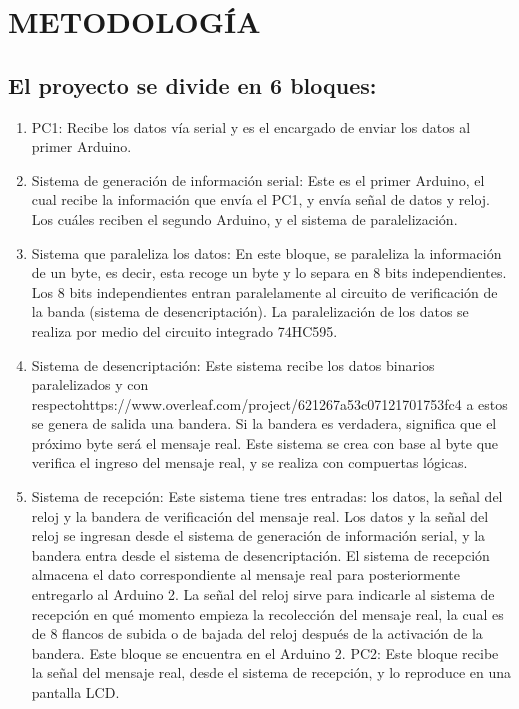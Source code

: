 \documentclass{article}
\begin{document}
\section{METODOLOGÍA}

\subsection{El proyecto se divide en 6 bloques:}

\begin{enumerate}
\item PC1: Recibe los datos vía serial y es el encargado de enviar los datos al primer Arduino.

\item Sistema de generación de información serial:  Este es el primer Arduino, el cual recibe la información que envía el PC1, y envía señal de datos y reloj. Los cuáles reciben el segundo Arduino, y el sistema de paralelización.

\item Sistema que paraleliza los datos:  En este bloque, se paraleliza la información de un byte, es decir, esta recoge un byte y lo separa en 8 bits independientes. Los 8 bits independientes entran paralelamente al circuito de verificación de la banda (sistema de desencriptación). La paralelización de los datos se realiza por medio del circuito integrado 74HC595.

\item Sistema de desencriptación: Este sistema recibe los datos binarios paralelizados y con respectohttps://www.overleaf.com/project/621267a53c07121701753fc4 a estos se genera de salida una bandera. Si la bandera es verdadera, significa que el próximo byte será el mensaje real. Este sistema se crea con base al byte que verifica el ingreso del mensaje real, y se realiza con compuertas lógicas.

\item Sistema de recepción: Este sistema tiene tres entradas: los datos, la señal del reloj y la bandera de verificación del mensaje real. Los datos y la señal del reloj se ingresan desde el sistema de generación de información serial, y la bandera entra desde el sistema de desencriptación. El sistema de recepción almacena el dato correspondiente al mensaje real para posteriormente entregarlo al Arduino 2. La señal del reloj sirve para indicarle al sistema de recepción en qué momento empieza la recolección del mensaje real, la cual es de 8 flancos de subida o de bajada del reloj después de la activación de la bandera. Este bloque se encuentra en el Arduino 2.
PC2: Este bloque recibe la señal del mensaje real, desde el sistema de recepción, y lo reproduce en una pantalla LCD.

\end{enumerate}
\end{document}
